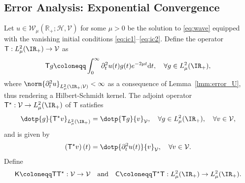 \subsection{Error Analysis: Exponential Convergence}\label{ssec:exponential_convergence}
Let $u \in \mathcal{W}_\mu(\mathbb{R}_+;\mathcal{H},\mathcal{V})$ for some $\mu>0$ be the solution to \eqref{eq:wave} equipped with the vanishing initial conditions \eqref{eq:ic1}--\eqref{eq:ic2}.
Define the operator $\mathsf{T}:L^2_\mu(\IR_+) \rightarrow \mathcal{V} $ as
\begin{equation}
	\mathsf{T} g
	\coloneqq
	\int_{0}^{\infty}
	\partial^2_t u(t)
	g(t)
	e^{-2\mu t}
	\text{d} t,
	\quad 
	\forall g \in L^2_\mu(\IR_+),
\end{equation}
where $\norm{\partial^2_t u}_{L^2_\mu(\IR_+;\mathcal{V})}<\infty$ 
as a consequence of Lemma~\ref{lmm:error_U}, thus rendering a Hilbert-Schmidt kernel. 
The adjoint operator $\mathsf{T}^\star: \mathcal{V} \rightarrow L^2_\mu(\IR_+)$ of $\mathsf{T}$
satisfies
\begin{equation}
	\dotp{
		g
	}{
		\mathsf{T}^\star 
		v
	}_{ L^2_\mu(\IR_+)}
	=
	\dotp{
		\mathsf{T} g
	}{
		 v
	}_{\mathcal{V}},
	\quad 
	\forall g \in L^2_\mu(\IR_+), 
	\quad
	\forall v \in \mathcal{V},
\end{equation}
and is given by
\begin{equation}
	\left(
		\mathsf{T}^\star 
		v
	\right)(t)
	=
	\dotp{
		\partial^2_t {u}(t)
	}{
		v
	}_{\mathcal{V}}
	,
	\quad 
	\forall v \in \mathcal{V}.
\end{equation}
Define
\begin{equation}
	\mathsf{K} \coloneqq \mathsf{T} \mathsf{T}^\star:\mathcal{V} \rightarrow \mathcal{V}
	\quad
	\text{and}
	\quad 
	\mathsf{C} \coloneqq \mathsf{T}^\star \mathsf{T}: L^2_\mu(\IR_+) \rightarrow L^2_\mu(\IR_+).
\end{equation}
